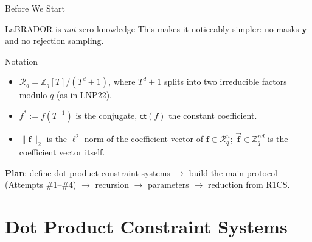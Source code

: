 \documentclass{zkdl-presentation-template}
\begin{document}
    \begin{frame}{Before We Start}
        \begin{alertblock}{LaBRADOR is \emph{not} zero-knowledge}
            This makes it noticeably simpler: no masks $\mathbf{y}$ and no rejection sampling.
        \end{alertblock}
        \pause

        \begin{block}{Notation}
            \begin{itemize}
                \item $\mathcal{R}_q = \mathbb{Z}_q[T]/(T^d+1)$, where $T^d+1$ splits into two irreducible factors modulo $q$ (as in LNP22).
                \item $f^{\ast} := f(T^{-1})$ is the conjugate, $\mathsf{ct}(f)$ the constant coefficient.
                \item $\|\mathbf{f}\|_2$ is the $\ell^2$ norm of the coefficient vector of $\mathbf{f} \in \mathcal{R}_q^n$; $\vec{\mathbf{f}} \in \mathbb{Z}_q^{nd}$ is the coefficient vector itself.
            \end{itemize}
        \end{block}
        \pause

        \textbf{Plan}: define dot product constraint systems $\rightarrow$ build the main protocol (Attempts \#1--\#4) $\rightarrow$ recursion $\rightarrow$ parameters $\rightarrow$ reduction from R1CS.
    \end{frame}

    \section{Dot Product Constraint Systems}
\end{document}
